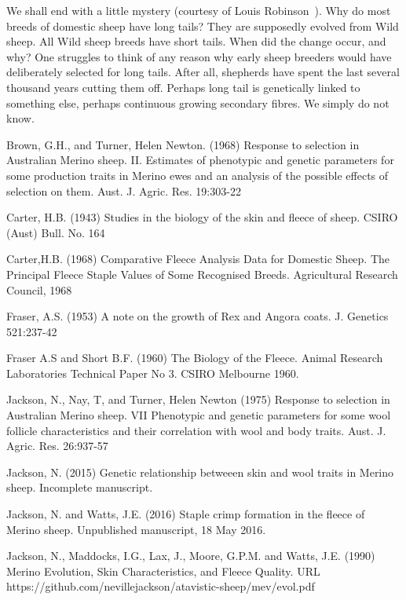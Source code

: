 \documentclass[titlepage]{article}  %
\begin{document}
We shall end with a little mystery (courtesy of Louis Robinson~\cite{robi:na}). Why do most breeds of domestic sheep have long tails? They are supposedly evolved from Wild sheep. All Wild sheep breeds have short tails. When did the change occur, and why? One struggles to think of any reason why early sheep breeders would have deliberately selected for long tails.  After all, shepherds have spent the last several thousand years cutting them off. Perhaps long tail is genetically linked to something else, perhaps continuous growing secondary fibres. We simply do not know.

\clearpage
\begin{thebibliography}{99}

Brown, G.H., and Turner, Helen Newton. (1968) Response to selection in Australian Merino sheep. II. Estimates of phenotypic and genetic parameters for some production traits in Merino ewes and an analysis of the possible effects of selection on them. Aust. J. Agric. Res. 19:303-22

Carter, H.B. (1943) Studies in the biology of the skin and fleece of sheep. CSIRO (Aust) Bull. No. 164

Carter,H.B. (1968) Comparative Fleece Analysis Data for Domestic Sheep. The Principal Fleece Staple Values of Some Recognised Breeds. Agricultural Research Council, 1968
 
Fraser, A.S. (1953) A note on the growth of Rex and Angora coats. J. Genetics 521:237-42

Fraser A.S and Short B.F. (1960) The Biology of the Fleece. Animal Research Laboratories Technical Paper No 3. CSIRO Melbourne 1960.

Jackson, N., Nay, T, and Turner, Helen Newton (1975) Response to selection in Australian Merino sheep. VII Phenotypic and genetic parameters for some wool follicle characteristics and their correlation with wool and body traits. Aust. J. Agric. Res. 26:937-57

Jackson, N. (2015) Genetic relationship betweeen skin and wool traits in Merino sheep. Incomplete manuscript.

Jackson, N. and Watts, J.E. (2016) Staple crimp formation in the fleece of Merino sheep. Unpublished manuscript, 18 May 2016.

Jackson, N., Maddocks, I.G., Lax, J., Moore, G.P.M. and Watts, J.E. (1990) Merino Evolution, Skin Characteristics, and Fleece Quality. URL https://github.com/nevillejackson/atavistic-sheep/mev/evol.pdf 


\end{thebibliography}
\end{document}
